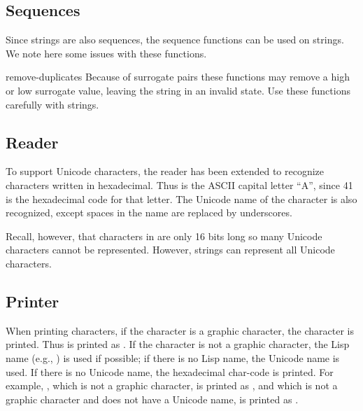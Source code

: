 \subsection{Sequences}

Since strings are also sequences, the sequence functions can be used
on strings.  We note here some issues with these functions.

\begin{defun}{}{remove-duplicates}{\args {}
    }
  Because of surrogate pairs these functions may remove a high or low
  surrogate value, leaving the string in an invalid state.  Use these
  functions carefully with strings.
\end{defun}


\subsection{Reader}

To support Unicode characters, the reader has been extended to
recognize characters written in hexadecimal.  Thus  is
the ASCII capital letter ``A'', since 41 is the hexadecimal code for
that letter.  The Unicode name of the character is also recognized,
except spaces in the name are replaced by underscores.

Recall, however, that characters in \cmucl{} are only 16 bits long so
many Unicode characters cannot be represented.  However, strings can
represent all Unicode characters.

\subsection{Printer}

When printing characters, if the character is a graphic character, the
character is printed.  Thus  is printed as
.  If the character is not a graphic character, the Lisp
name (e.g., ) is used if possible;
if there is no Lisp name, the Unicode name is used.  If there is no
Unicode name, the hexadecimal char-code is
printed.  For example, , which is not a graphic
character, is printed as ,
and  which is not a graphic character and does not have a
Unicode name, is printed as .

